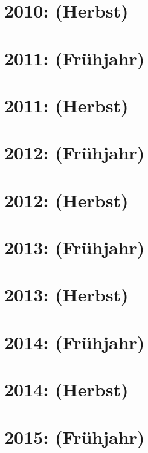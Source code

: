 \documentclass{lehramt-informatik-haupt}
\begin{document}
\section{2010: (Herbst)}


\section{2011: (Frühjahr)}


\section{2011: (Herbst)}


\section{2012: (Frühjahr)}


\section{2012: (Herbst)}


\section{2013: (Frühjahr)}


\section{2013: (Herbst)}


\section{2014: (Frühjahr)}


\section{2014: (Herbst)}


\section{2015: (Frühjahr)}

\end{document}
